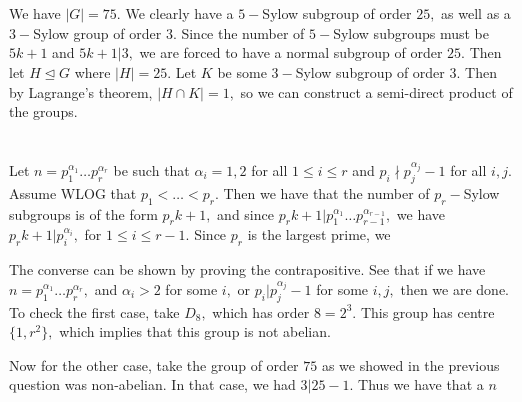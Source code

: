 \documentclass{article}
\begin{document}
\section{} %
\section{} %
We have $|G| =75.$ We clearly have a $5-$Sylow subgroup of order $25,$ as well as a $3-$Sylow group of order $3.$ Since the number of $5-$Sylow subgroups 
must be $5k+1$ and $5k+1|3,$ we are forced to have a normal subgroup of order $25.$ Then let $H \trianglelefteq G$ where $|H|=25.$ Let $K$ be some $3-$Sylow 
subgroup of order $3.$ Then by Lagrange's theorem, $|H \cap K|=1,$ so we can construct a semi-direct product of the groups.  
\section{} %
Let $n= p_1^{\alpha_1}\dots p_r^{\alpha_r}$ be such that $\alpha_i=1,2$ for all $1 \leq i \leq r$ and $p_i \nmid p_j^{\alpha_j}-1$ for all $i,j.$ 
Assume WLOG that $p_1 < \dots < p_r.$ Then we have that the number of $p_r-$Sylow subgroups is of the form $p_rk+1,$ and since $p_rk+1 | p_1^{\alpha_1}\dots 
p_{r-1}^{\alpha_{r-1}},$ we have $p_rk+1|p_i^{\alpha_i},$ for $1 \leq i \leq r-1.$ Since $p_r$ is the largest prime, we 

The converse can be shown by proving the contrapositive. See that if we have $n=p_1^{\alpha_1}\dots p_r^{\alpha_r},$ and $\alpha_i>2$ for some $i,$ or $p_i 
| p_j^{\alpha_j}-1$ for some $i,j,$ then we are done. To check the first case, take $D_8,$ which has order $8=2^3.$ This group has centre $\{1,r^2\},$ which 
implies that this group is not abelian.

Now for the other case, take the group of order $75$ as we showed in the previous question was non-abelian. In that case, we had $3|25-1.$ Thus we have that 
a  $n$
\end{document}
